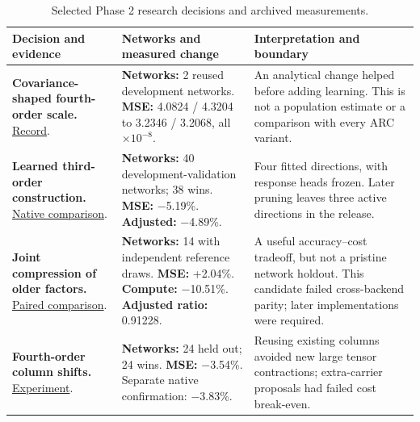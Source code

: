 \documentclass[11pt,letterpaper]{article}
\begin{document}
\begin{table}[htbp]
\centering
\small
\caption{Selected Phase 2 research decisions and archived measurements.}\label{tab:research}
\begin{tabular}{@{}>{\raggedright\arraybackslash}p{}>{\raggedright\arraybackslash}p{}>{\raggedright\arraybackslash}p{}@{}}
\toprule
Decision and evidence & Networks and measured change & Interpretation and boundary \\
\midrule
\textbf{Covariance-shaped fourth-order scale.} \href{https://github.com/mattliston/arc-whitebox-estimation-challenge/blob/main/experiments/wall-and-residual/exact-kernel-resource-tradeoff/RESEARCH_RECEIPTS_2026_09_04.md\#L8}{Record}. & \textbf{Networks:} 2 reused development networks. \textbf{MSE:} 4.0824 / 4.3204 to 3.2346 / 3.2068, all \(\times10^{-8}\). & An analytical change helped before adding learning. This is not a population estimate or a comparison with every ARC variant. \\[3pt]
\textbf{Learned third-order construction.} \href{https://github.com/mattliston/arc-whitebox-estimation-challenge/blob/main/experiments/birth-terms/four-fitted-birth-directions-pass-native40-independent14-adjusted-ratios/NATIVE40_RESULT_2026_09_08.md}{Native comparison}. & \textbf{Networks:} 40 development-validation networks; 38 wins. \textbf{MSE:} \(-\)5.19\%. \textbf{Adjusted:} \(-\)4.89\%. & Four fitted directions, with response heads frozen. Later pruning leaves three active directions in the release. \\[3pt]
\textbf{Joint compression of older factors.} \href{https://github.com/mattliston/arc-whitebox-estimation-challenge/blob/main/experiments/evaluation-methodology/shared-rank-384-old-basis-independent-14-adjusted-3/INDEPENDENT14_AND_PARITY_RESULT_20260912.md}{Paired comparison}. & \textbf{Networks:} 14 with independent reference draws. \textbf{MSE:} +2.04\%. \textbf{Compute:} \(-\)10.51\%. \textbf{Adjusted ratio:} 0.91228. & A useful accuracy--cost tradeoff, but not a pristine network holdout. This candidate failed cross-backend parity; later implementations were required. \\[3pt]
\textbf{Fourth-order column shifts.} \href{https://github.com/mattliston/arc-whitebox-estimation-challenge/tree/main/experiments/fourth-order-terms/young-column-fourth-cumulant-shifts-reduce-held-out-error/}{Experiment}. & \textbf{Networks:} 24 held out; 24 wins. \textbf{MSE:} \(-\)3.54\%. Separate native confirmation: \(-\)3.83\%. & Reusing existing columns avoided new large tensor contractions; extra-carrier proposals had failed cost break-even. \\[3pt]

\end{tabular}
\end{table}
\end{document}
